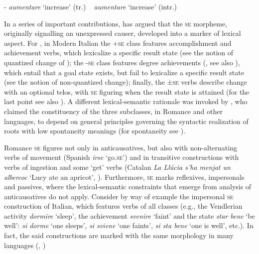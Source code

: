 \documentclass[output=paper,colorlinks,citecolor=brown
]{langscibook}
\begin{document}
\ex \label{bentley_example_1c}	
 - \textit{aumentare} ‘increase’ (tr.) ~ \textit{aumentare} ‘increase’ (intr.)  \\
\z
\z

In a series of important contributions, \citet{cennamo1995patterns,cennamo1999late,cennamo2012aspectual,cennamo2015valency,cennamo2021anticausatives,cennamo2022anticausativization} has argued that the \textsc{se} morpheme, originally signalling an unexpressed causer, developed into a marker of lexical aspect. For \citet{cennamo2012aspectual}, in Modern Italian the +\textsc{se} class features accomplishment and achievement verbs, which lexicalize a specific result state (see the notion of quantized change of \cite{hay1999scalar,beavers2011affectedness}); the -\textsc{se} class features degree achievements 
(\cite[88--90]{dowty1979word}, see also \cite{bertinetto1995attempt,hay1999scalar,beavers2011affectedness}), which entail that a goal state exists, but fail to lexicalize a specific result state (see the notion of non-quantized change);  finally, the ±\textsc{se} verbs describe change with an optional telos, with \textsc{se} figuring when the result state is attained (for the last point see also \cites[{}][161--163]{folli2002constructing,jezek2003classi}). A different lexical-semantic rationale was invoked by \citet[96, 114--120]{alexiadou2015external}, who claimed the constituency of the three subclasses, in Romance and other languages, to depend on general principles governing the syntactic realization of roots with low spontaneity meanings (for spontaneity see \cite{haspelmath1993more,haspelmath2016universals}). 

Romance \textsc{se} figures not only in anticausatives, but also with non-alternating verbs of movement (Spanish \textit{irse} ‘go.\textsc{se}’) and in transitive constructions with verbs of ingestion and some ‘get’ verbs \citep[48]{levin1993english} (Catalan \textit{La Llúcia s’ha menjat un albercoc} ‘Lucy ate an apricot’, \cite[505]{acedomatellan2022argument}). Furthermore, \textsc{se} marks reflexives, impersonals and passives, where the lexical-semantic constraints that emerge from analysis of anticausatives do not apply. Consider by way of example the impersonal \textsc{se} construction of Italian, which features verbs of all classes (e.g., the Vendlerian activity \textit{dormire} ‘sleep’, the achievement \textit{svenire} ‘faint’ and the state \textit{star bene} ‘be well’: \textit{si dorme} ‘one sleeps’, \textit{si sviene} ‘one faints’, \textit{si sta bene} ‘one is well’, etc.). In fact, the said constructions are marked with the same morphology in many languages (\cite[371--374]{lyons1969introduction}, \cite{kemmer1993middle,beavers2023middle}) 
\end{document}

